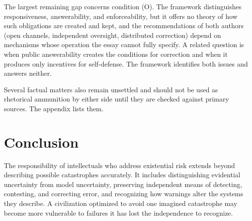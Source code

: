 \documentclass[11pt]{article}
\begin{document}
The largest remaining gap concerns condition (O). The framework distinguishes responsiveness, answerability, and enforceability, but it offers no theory of how such obligations are created and kept, and the recommendations of both authors (open channels, independent oversight, distributed correction) depend on mechanisms whose operation the essay cannot fully specify. A related question is when public answerability creates the conditions for correction and when it produces only incentives for self-defense. The framework identifies both issues and answers neither.

Several factual matters also remain unsettled and should not be used as rhetorical ammunition by either side until they are checked against primary sources. The appendix lists them.

\section{Conclusion}

The responsibility of intellectuals who address existential risk extends beyond describing possible catastrophes accurately. It includes distinguishing evidential uncertainty from model uncertainty, preserving independent means of detecting, contesting, and correcting error, and recognizing how warnings alter the systems they describe. A civilization optimized to avoid one imagined catastrophe may become more vulnerable to failures it has lost the independence to recognize.
\end{document}
